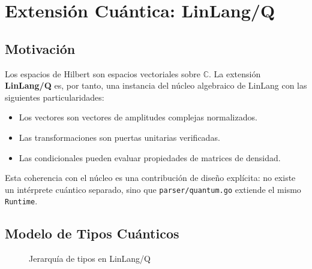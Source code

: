 \documentclass[12pt, a4paper, openany]{report}
\theoremstyle{definition}
\newcommand{\linlangQ}{\textbf{LinLang/Q}}
\begin{document}
\chapter{Extensión Cuántica: LinLang/Q}
\label{ch:quantum}

\section{Motivación}

Los espacios de Hilbert son espacios vectoriales sobre $\mathbb{C}$. La extensión \linlangQ{} es, por tanto, una instancia del núcleo algebraico de LinLang con las siguientes particularidades:

\begin{itemize}
  \item Los vectores son vectores de amplitudes complejas normalizados.
  \item Las transformaciones son puertas unitarias verificadas.
  \item Las condicionales pueden evaluar propiedades de matrices de densidad.
\end{itemize}

Esta coherencia con el núcleo es una contribución de diseño explícita: no existe un intérprete cuántico separado, sino que \texttt{parser/quantum.go} extiende el mismo \texttt{Runtime}.

\section{Modelo de Tipos Cuánticos}

\begin{figure}[H]
\centering
{}
\caption{Jerarquía de tipos en LinLang/Q}
\end{figure}
\end{document}
